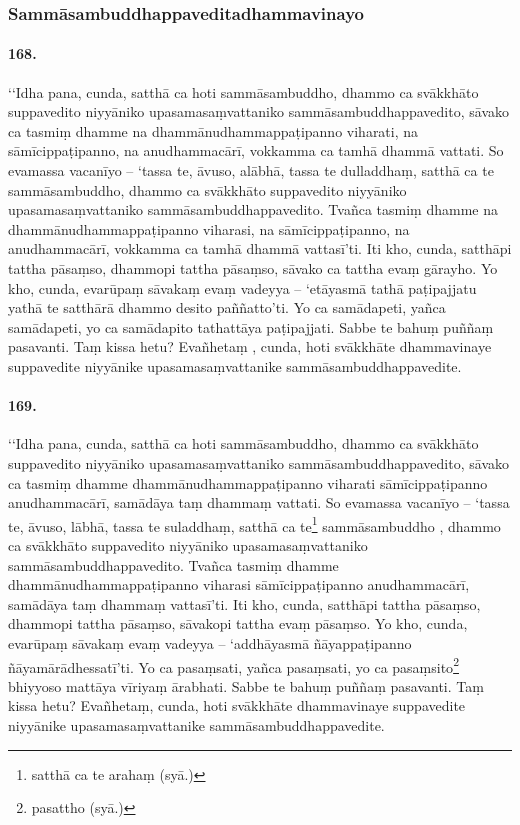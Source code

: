 \subsubsection{Sammāsambuddhappaveditadhammavinayo}

\paragraph{168.} ‘‘Idha pana, cunda, satthā ca hoti sammāsambuddho, dhammo ca svākkhāto suppavedito niyyāniko upasamasaṃvattaniko sammāsambuddhappavedito, sāvako ca tasmiṃ dhamme na dhammānudhammappaṭipanno viharati, na sāmīcippaṭipanno, na anudhammacārī, vokkamma ca tamhā dhammā vattati. So evamassa vacanīyo – ‘tassa te, āvuso, alābhā, tassa te dulladdhaṃ, satthā ca te sammāsambuddho, dhammo ca svākkhāto suppavedito niyyāniko upasamasaṃvattaniko sammāsambuddhappavedito. Tvañca tasmiṃ dhamme na dhammānudhammappaṭipanno viharasi, na sāmīcippaṭipanno, na anudhammacārī, vokkamma ca tamhā dhammā vattasī’ti. Iti kho, cunda, satthāpi tattha pāsaṃso, dhammopi tattha pāsaṃso, sāvako ca tattha evaṃ gārayho. Yo kho, cunda, evarūpaṃ sāvakaṃ evaṃ vadeyya – ‘etāyasmā tathā paṭipajjatu yathā te satthārā dhammo desito paññatto’ti. Yo ca samādapeti, yañca samādapeti, yo ca samādapito tathattāya paṭipajjati. Sabbe te bahuṃ puññaṃ pasavanti. Taṃ kissa hetu? Evañhetaṃ , cunda, hoti svākkhāte dhammavinaye suppavedite niyyānike upasamasaṃvattanike sammāsambuddhappavedite.

\paragraph{169.} ‘‘Idha pana, cunda, satthā ca hoti sammāsambuddho, dhammo ca svākkhāto suppavedito niyyāniko upasamasaṃvattaniko sammāsambuddhappavedito, sāvako ca tasmiṃ dhamme dhammānudhammappaṭipanno viharati sāmīcippaṭipanno anudhammacārī, samādāya taṃ dhammaṃ vattati. So evamassa vacanīyo – ‘tassa te, āvuso, lābhā, tassa te suladdhaṃ, satthā ca te\footnote{satthā ca te arahaṃ (syā.)} sammāsambuddho , dhammo ca svākkhāto suppavedito niyyāniko upasamasaṃvattaniko sammāsambuddhappavedito. Tvañca tasmiṃ dhamme dhammānudhammappaṭipanno viharasi sāmīcippaṭipanno anudhammacārī, samādāya taṃ dhammaṃ vattasī’ti. Iti kho, cunda, satthāpi tattha pāsaṃso, dhammopi tattha pāsaṃso, sāvakopi tattha evaṃ pāsaṃso. Yo kho, cunda, evarūpaṃ sāvakaṃ evaṃ vadeyya – ‘addhāyasmā ñāyappaṭipanno ñāyamārādhessatī’ti. Yo ca pasaṃsati, yañca pasaṃsati, yo ca pasaṃsito\footnote{pasattho (syā.)} bhiyyoso mattāya vīriyaṃ ārabhati. Sabbe te bahuṃ puññaṃ pasavanti. Taṃ kissa hetu? Evañhetaṃ, cunda, hoti svākkhāte dhammavinaye suppavedite niyyānike upasamasaṃvattanike sammāsambuddhappavedite.

